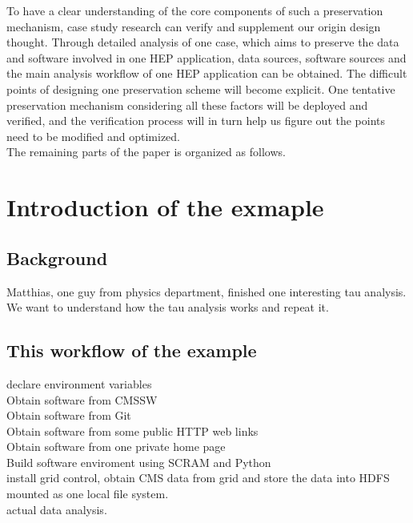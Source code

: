 \documentclass{article}
\begin{document}
To have a clear understanding of the core components of such a preservation mechanism, case study research can verify and supplement our origin design thought. Through detailed analysis of one case, which aims to preserve the data and software involved in one HEP application, data sources, software sources and the main analysis workflow of one HEP application can be obtained. The difficult points of designing one preservation scheme will become explicit. One tentative preservation mechanism considering all these factors will be deployed and verified, and the verification process will in turn help us figure out the points need to be modified and optimized.\\

The remaining parts of the paper is organized as follows. 

\section{Introduction of the exmaple}
\subsection{Background}
\indent Matthias, one guy from physics department, finished one interesting tau analysis. We want to understand how the tau analysis works and repeat it. 

\subsection{This workflow of the example}
\indent declare environment variables\\

Obtain software from CMSSW\\

Obtain software from Git\\

Obtain software from some public HTTP web links\\

Obtain software from one private home page\\

Build software enviroment using SCRAM and Python\\

install grid control, obtain CMS data from grid and store the data into HDFS mounted as one local file system.\\

actual data analysis.
\end{document}
